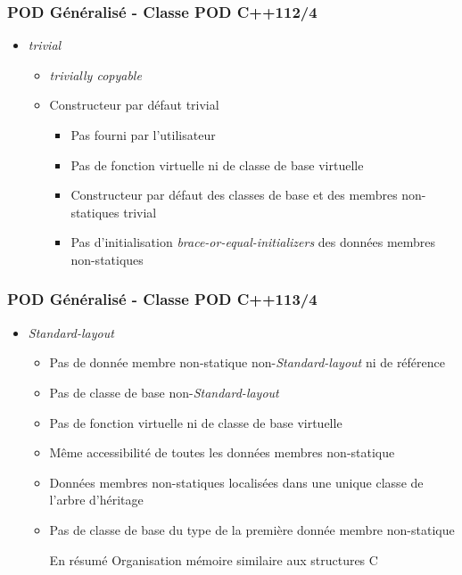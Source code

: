 \documentclass[C++.tex]{subfiles}
\begin{document}
\begin{frame}[fragile]
	\frametitle{POD Généralisé - Classe POD C++11\titlehfill{}2/4}
	\begin{itemize}
		\item \textit{trivial}
		\begin{itemize}
			\item \textit{trivially copyable}
			\item Constructeur par défaut trivial
			\begin{itemize}
				\item Pas fourni par l'utilisateur
				\item Pas de fonction virtuelle ni de classe de base virtuelle
				\item Constructeur par défaut des classes de base et des membres non-statiques trivial
				\item Pas d'initialisation \textit{brace-or-equal-initializers} des données membres non-statiques
			\end{itemize}
		\end{itemize}
	\end{itemize}
\end{frame}

\begin{frame}[fragile]
	\frametitle{POD Généralisé - Classe POD C++11\titlehfill{}3/4}
	\begin{itemize}
		\item \textit{Standard-layout}
		\begin{itemize}
			\item Pas de donnée membre non-statique non-\textit{Standard-layout} ni de référence
			\item Pas de classe de base non-\textit{Standard-layout}
			\item Pas de fonction virtuelle ni de classe de base virtuelle
			\item Même accessibilité de toutes les données membres non-statique
			\item Données membres non-statiques localisées dans une unique classe de l'arbre d'héritage


			\item Pas de classe de base du type de la première donnée membre non-statique

			\pause

			\begin{block}{En résumé}
				Organisation mémoire similaire aux structures C
			\end{block}
		\end{itemize}
	\end{itemize}
\end{frame}
\end{document}
